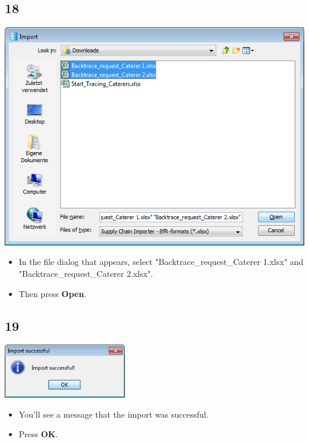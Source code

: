\documentclass{beamer}
\begin{document}
\subsection{18}
\begin{frame}
	\begin{center}
  		\includegraphics[height=0.5\textheight]{18.png}
	\end{center}
	\begin{itemize}
		\item In the file dialog that appears, select "Backtrace\_request\_Caterer 1.xlsx" and "Backtrace\_request\_Caterer 2.xlsx".
		\item Then press \textbf{Open}.
	\end{itemize}
\end{frame}

\subsection{19}
\begin{frame}
	\begin{center}
  		\includegraphics[width=0.4\textwidth]{19.png}
	\end{center}
	\begin{itemize}
		\item You'll see a message that the import was successful.
		\item Press \textbf{OK}.
	\end{itemize}
\end{frame}
\end{document}
